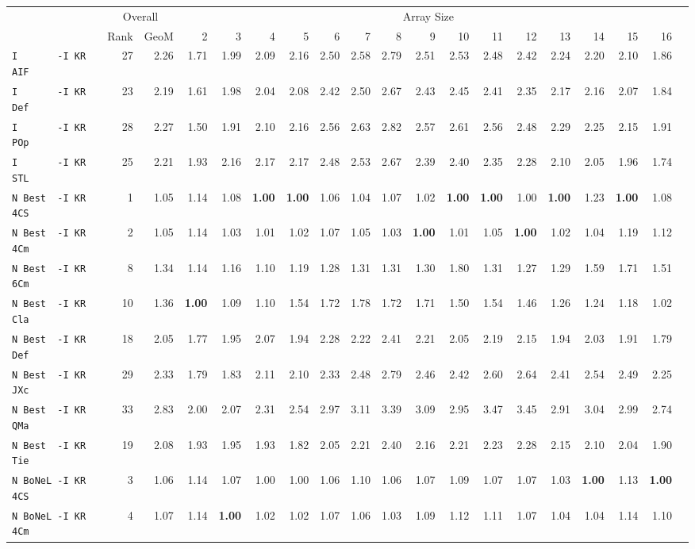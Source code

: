 \begin{tabular}{l | r @{~~} r | r@{~~}r@{~~}r@{~~}r@{~~}r@{~~}r@{~~}r@{~~}r@{~~}r@{~~}r@{~~}r@{~~}r@{~~}r@{~~}r@{~~}r@{~~}r|}
 & \multicolumn{2}{c}{Overall} & \multicolumn{15}{c}{Array Size} \\
 & Rank & GeoM & 2&3&4&5&6&7&8&9&10&11&12&13&14&15&16\\ \hline
\verb+I       -I KR AIF+ & 27 & 2.26 & 1.71&1.99&2.09&2.16&2.50&2.58&2.79&2.51&2.53&2.48&2.42&2.24&2.20&2.10&1.86\\
\verb+I       -I KR Def+ & 23 & 2.19 & 1.61&1.98&2.04&2.08&2.42&2.50&2.67&2.43&2.45&2.41&2.35&2.17&2.16&2.07&1.84\\
\verb+I       -I KR POp+ & 28 & 2.27 & 1.50&1.91&2.10&2.16&2.56&2.63&2.82&2.57&2.61&2.56&2.48&2.29&2.25&2.15&1.91\\
\verb+I       -I KR STL+ & 25 & 2.21 & 1.93&2.16&2.17&2.17&2.48&2.53&2.67&2.39&2.40&2.35&2.28&2.10&2.05&1.96&1.74\\
\verb+N Best  -I KR 4CS+ & 1 & 1.05 & 1.14&1.08&\textbf{1.00}&\textbf{1.00}&1.06&1.04&1.07&1.02&\textbf{1.00}&\textbf{1.00}&1.00&\textbf{1.00}&1.23&\textbf{1.00}&1.08\\
\verb+N Best  -I KR 4Cm+ & 2 & 1.05 & 1.14&1.03&1.01&1.02&1.07&1.05&1.03&\textbf{1.00}&1.01&1.05&\textbf{1.00}&1.02&1.04&1.19&1.12\\
\verb+N Best  -I KR 6Cm+ & 8 & 1.34 & 1.14&1.16&1.10&1.19&1.28&1.31&1.31&1.30&1.80&1.31&1.27&1.29&1.59&1.71&1.51\\
\verb+N Best  -I KR Cla+ & 10 & 1.36 & \textbf{1.00}&1.09&1.10&1.54&1.72&1.78&1.72&1.71&1.50&1.54&1.46&1.26&1.24&1.18&1.02\\
\verb+N Best  -I KR Def+ & 18 & 2.05 & 1.77&1.95&2.07&1.94&2.28&2.22&2.41&2.21&2.05&2.19&2.15&1.94&2.03&1.91&1.79\\
\verb+N Best  -I KR JXc+ & 29 & 2.33 & 1.79&1.83&2.11&2.10&2.33&2.48&2.79&2.46&2.42&2.60&2.64&2.41&2.54&2.49&2.25\\
\verb+N Best  -I KR QMa+ & 33 & 2.83 & 2.00&2.07&2.31&2.54&2.97&3.11&3.39&3.09&2.95&3.47&3.45&2.91&3.04&2.99&2.74\\
\verb+N Best  -I KR Tie+ & 19 & 2.08 & 1.93&1.95&1.93&1.82&2.05&2.21&2.40&2.16&2.21&2.23&2.28&2.15&2.10&2.04&1.90\\
\verb+N BoNeL -I KR 4CS+ & 3 & 1.06 & 1.14&1.07&1.00&1.00&1.06&1.10&1.06&1.07&1.09&1.07&1.07&1.03&\textbf{1.00}&1.13&\textbf{1.00}\\
\verb+N BoNeL -I KR 4Cm+ & 4 & 1.07 & 1.14&\textbf{1.00}&1.02&1.02&1.07&1.06&1.03&1.09&1.12&1.11&1.07&1.04&1.04&1.14&1.10\\

\end{tabular}
